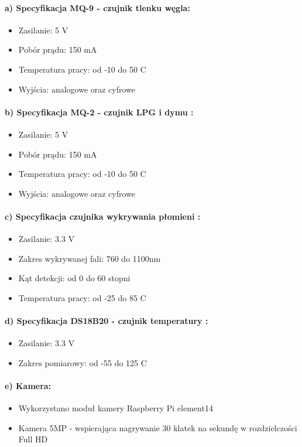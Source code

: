 \paragraph{a) Specyfikacja MQ-9 - czujnik tlenku węgla\cite{specyfikacjaMQ-9}:}
\begin{itemize} 
\item Zasilanie: 5 V
\item Pobór prądu: 150 mA
\item Temperatura pracy: od -10 do 50 \textdegree{}C
\item Wyjścia: analogowe oraz cyfrowe
\end{itemize}
\paragraph{b) Specyfikacja MQ-2 - czujnik LPG i dymu \protect\cite{specyfikacjaMQ-2}:}
\begin{itemize} 
\item Zasilanie: 5 V
\item Pobór prądu: 150 mA
\item Temperatura pracy: od -10 do 50 \textdegree{}C
\item Wyjścia: analogowe oraz cyfrowe
\end{itemize}
\paragraph{c) Specyfikacja czujnika wykrywania płomieni \protect\cite{specyfikacjaFlame}:}
\begin{itemize} 
\item Zasilanie: 3.3 V
\item Zakres wykrywanej fali: 760 do 1100nm
\item Kąt detekcji: od 0 do 60 stopni
\item Temperatura pracy: od -25 do 85 \textdegree{}C
\end{itemize}
\paragraph{d) Specyfikacja DS18B20 - czujnik temperatury \protect\cite{specyfikacjaTemp}:}
\begin{itemize} 
\item Zasilanie: 3.3 V
\item Zakres pomiarowy: od -55 do 125 \textdegree{}C
\end{itemize}
\paragraph{e) Kamera:}
\begin{itemize} 
\item Wykorzystano moduł kamery Raspberry Pi element14
\item Kamera 5MP - wspierająca nagrywanie 30 klatek na sekundę w rozdzielczości Full HD
\end{itemize}

